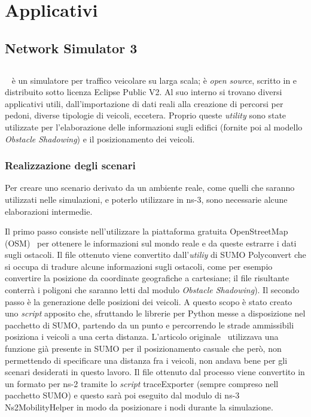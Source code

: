 
\chapter{Applicativi}\label{chap:applicativi}
\section{Network Simulator 3}\label{sec:ns-3}
%
%
\section{\SUMO}\label{sec:sumo}
\SUMO~\cite{SUMO2012} è un simulatore per traffico veicolare su larga scala; è \textit{open source}, scritto in \Cpp
e distribuito sotto licenza Eclipse Public V2.
Al suo interno si trovano diversi applicativi utili, dall'importazione di dati reali alla creazione di percorsi
per pedoni, diverse tipologie di veicoli, eccetera.
Proprio queste \textit{utility} sono state utilizzate per l'elaborazione delle informazioni sugli edifici (fornite poi
al modello \textit{Obstacle Shadowing}) e il posizionamento dei veicoli.
%
\subsection{Realizzazione degli scenari}
Per creare uno scenario derivato da un ambiente reale, come quelli che saranno utilizzati nelle simulazioni,
e poterlo utilizzare in ns-3, sono necessarie alcune elaborazioni intermedie.

Il primo passo consiste nell'utilizzare la piattaforma gratuita OpenStreetMap (OSM)~\cite{osmWebsite} per
ottenere le informazioni sul mondo reale e da queste estrarre i dati sugli ostacoli.
Il file ottenuto viene convertito dall'\textit{utiliy} di SUMO Polyconvert che si occupa di tradure alcune informazioni
sugli ostacoli, come per esempio convertire la posizione da coordinate geografiche a cartesiane;
il file risultante conterrà i poligoni che saranno letti dal modulo \textit{Obstacle Shadowing}).
Il secondo passo è la generazione delle posizioni dei veicoli.
A questo scopo è stato creato uno \textit{script} apposito che, sfruttando le librerie per Python messe a disposizione
nel pacchetto di SUMO, partendo da un punto e percorrendo le strade ammissibili posiziona i veicoli a una certa distanza.
L'articolo originale~\cite{Carpenter:2015:OMI:2756509.2756512} utilizzava una funzione già presente in SUMO
per il posizionamento casuale che però, non permettendo di specificare una distanza fra i veicoli, non andava bene per gli scenari desiderati in questo lavoro.
%
Il file ottenuto dal processo viene convertito in un formato per ns-2 tramite lo \textit{script} traceExporter (sempre compreso nell pacchetto SUMO)
e questo sarà poi eseguito dal modulo di ns-3 \textsf{Ns2MobilityHelper} in modo da posizionare i nodi durante la simulazione.

